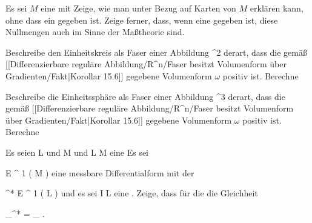 {}
{

Es sei $M$ eine
mit
Zeige, wie man unter Bezug auf Karten  von $M$ erklären kann, ohne dass ein
gegeben ist. Zeige ferner, dass, wenn eine
gegeben ist, diese Nullmengen auch
im Sinne der Maßtheorie sind.

}
{} {}

{}
{

Beschreibe den Einheitskreis
 als Faser einer Abbildung
\maabbdisp {} {\R^2} {\R
} {}
derart, dass die gemäß
[[Differenzierbare reguläre Abbildung/R^n/Faser besitzt Volumenform über Gradienten/Fakt|Korollar 15.6]]
gegebene Volumenform $\omega$  positiv ist. Berechne

}
{} {}

{}
{

Beschreibe die Einheitssphäre
 als Faser einer Abbildung
\maabbdisp {} {\R^3} {\R
} {}
derart, dass die gemäß
[[Differenzierbare reguläre Abbildung/R^n/Faser besitzt Volumenform über Gradienten/Fakt|Korollar 15.6]]
gegebene Volumenform $\omega$  positiv ist. Berechne

}
{} {}

{}
{

Es seien
\mathkor {} {L} {und} {M} {}
und
\maabbdisp {\varphi} { L } { M
} {}
eine
Es sei

\mavergleichskette
{\vergleichskette
{ \omega
}
{ \in }{
{ \mathcal E }^{  1 } (  M   )
}
{  }{
}
{    }{
}
{   }{
}
}
{}{}{}
eine messbare Differentialform mit der

\mavergleichskette
{\vergleichskette
{ \varphi^*\omega
}
{ \in }{
{ \mathcal E }^{  1 } (  L   )
}
{  }{
}
{    }{
}
{   }{
}
}
{}{}{}
und es sei
\maabbdisp {\gamma} { I } { L
} {}
eine
 {} {.}
Zeige, dass für die
die Gleichheit

\mavergleichskettedisp
{\vergleichskette
{ \int_\gamma \varphi^* \omega
}
{ =} { \int_{\varphi \circ \gamma} \omega
}
{ } {
}
{ } {
}
{ } {
}
}
{}{}{.}

}
{} {}

